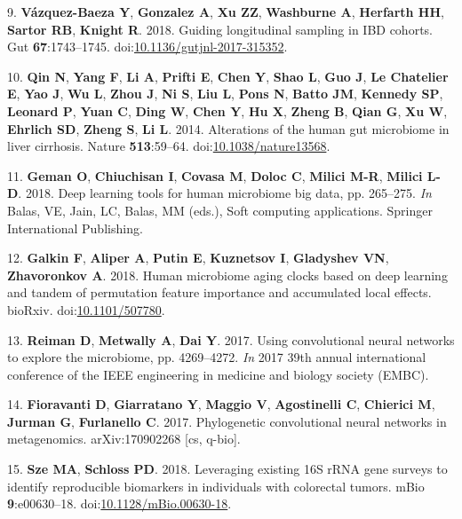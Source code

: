 \documentclass[11pt,]{article}
\begin{document}
\hypertarget{ref-vazquez-baeza_guiding_2018}{}
9. \textbf{Vázquez-Baeza Y}, \textbf{Gonzalez A}, \textbf{Xu ZZ},
\textbf{Washburne A}, \textbf{Herfarth HH}, \textbf{Sartor RB},
\textbf{Knight R}. 2018. Guiding longitudinal sampling in IBD cohorts.
Gut \textbf{67}:1743--1745.
doi:\href{https://doi.org/10.1136/gutjnl-2017-315352}{10.1136/gutjnl-2017-315352}.

\hypertarget{ref-qin_alterations_2014}{}
10. \textbf{Qin N}, \textbf{Yang F}, \textbf{Li A}, \textbf{Prifti E},
\textbf{Chen Y}, \textbf{Shao L}, \textbf{Guo J}, \textbf{Le Chatelier
E}, \textbf{Yao J}, \textbf{Wu L}, \textbf{Zhou J}, \textbf{Ni S},
\textbf{Liu L}, \textbf{Pons N}, \textbf{Batto JM}, \textbf{Kennedy SP},
\textbf{Leonard P}, \textbf{Yuan C}, \textbf{Ding W}, \textbf{Chen Y},
\textbf{Hu X}, \textbf{Zheng B}, \textbf{Qian G}, \textbf{Xu W},
\textbf{Ehrlich SD}, \textbf{Zheng S}, \textbf{Li L}. 2014. Alterations
of the human gut microbiome in liver cirrhosis. Nature
\textbf{513}:59--64.
doi:\href{https://doi.org/10.1038/nature13568}{10.1038/nature13568}.

\hypertarget{ref-geman_deep_2018}{}
11. \textbf{Geman O}, \textbf{Chiuchisan I}, \textbf{Covasa M},
\textbf{Doloc C}, \textbf{Milici M-R}, \textbf{Milici L-D}. 2018. Deep
learning tools for human microbiome big data, pp. 265--275. \emph{In}
Balas, VE, Jain, LC, Balas, MM (eds.), Soft computing applications.
Springer International Publishing.

\hypertarget{ref-galkin_human_2018}{}
12. \textbf{Galkin F}, \textbf{Aliper A}, \textbf{Putin E},
\textbf{Kuznetsov I}, \textbf{Gladyshev VN}, \textbf{Zhavoronkov A}.
2018. Human microbiome aging clocks based on deep learning and tandem of
permutation feature importance and accumulated local effects. bioRxiv.
doi:\href{https://doi.org/10.1101/507780}{10.1101/507780}.

\hypertarget{ref-reiman_using_2017}{}
13. \textbf{Reiman D}, \textbf{Metwally A}, \textbf{Dai Y}. 2017. Using
convolutional neural networks to explore the microbiome, pp. 4269--4272.
\emph{In} 2017 39th annual international conference of the IEEE
engineering in medicine and biology society (EMBC).

\hypertarget{ref-fioravanti_phylogenetic_2017}{}
14. \textbf{Fioravanti D}, \textbf{Giarratano Y}, \textbf{Maggio V},
\textbf{Agostinelli C}, \textbf{Chierici M}, \textbf{Jurman G},
\textbf{Furlanello C}. 2017. Phylogenetic convolutional neural networks
in metagenomics. arXiv:170902268 {[}cs, q-bio{]}.

\hypertarget{ref-sze_leveraging_2018}{}
15. \textbf{Sze MA}, \textbf{Schloss PD}. 2018. Leveraging existing 16S
rRNA gene surveys to identify reproducible biomarkers in individuals
with colorectal tumors. mBio \textbf{9}:e00630--18.
doi:\href{https://doi.org/10.1128/mBio.00630-18}{10.1128/mBio.00630-18}.
\end{document}
